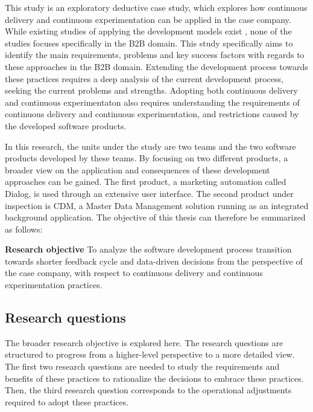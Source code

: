 \documentclass[english, grading]{tktltiki2}
\theoremstyle{definition}
\theoremstyle{remark}
\begin{document}
This study is an exploratory deductive case study, which explores how continuous delivery and continuous experimentation can be applied in the case company. While existing studies of applying the development models exist \cite{neely2013continuous, bosch2012building, fagerholm2014building}, none of the studies focuses specifically in the B2B domain. This study specifically aims to identify the main requirements, problems and key success factors with regards to these approaches in the B2B domain. Extending the development process towards these practices requires a deep analysis of the current development process, seeking the current problems and strengths. Adopting both continuous delivery and continuous experimentaton also requires understanding the requirements of continuous delivery and continuous experimentation, and restrictions caused by the developed software products. 

In this research, the units under the study are two teams and the two software products developed by these teams. By focusing on two different products, a broader view on the application and consequences of these development approaches can be gained. The first product, a marketing automation called Dialog, is used through an extensive user interface. The second product under inspection is CDM, a Master Data Management \cite{loshin2010master} solution running as an integrated background application. The objective of this thesis can therefore be summarized as follows:

\bigskip
\noindent \textbf{Research objective}
To analyze the software development process transition towards shorter feedback cycle and data-driven decisions from the perspective of the case company, with respect to continuous delivery and continuous experimentation practices.

\subsection{Research questions}

The broader research objective is explored here. The research questions are structured to progress from a higher-level perspective to a more detailed view. The first two research questions are needed to study the requirements and benefits of these practices to rationalize the decisions to embrace these practices. Then, the third research question corresponds to the operational adjustments required to adopt these practices. \newline
\end{document}
